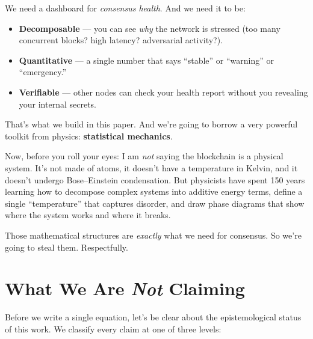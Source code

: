 \documentclass[11pt,a4paper]{article}
\begin{document}
We need a dashboard for \emph{consensus health}. And we need it to be:

\begin{itemize}
    \item \textbf{Decomposable} --- you can see \emph{why} the network is stressed (too many concurrent blocks? high latency? adversarial activity?).
    \item \textbf{Quantitative} --- a single number that says ``stable'' or ``warning'' or ``emergency.''
    \item \textbf{Verifiable} --- other nodes can check your health report without you revealing your internal secrets.
\end{itemize}

That's what we build in this paper. And we're going to borrow a very powerful toolkit from physics: \textbf{statistical mechanics}.

Now, before you roll your eyes: I am \emph{not} saying the blockchain is a physical system. It's not made of atoms, it doesn't have a temperature in Kelvin, and it doesn't undergo Bose--Einstein condensation. But physicists have spent 150 years learning how to decompose complex systems into additive energy terms, define a single ``temperature'' that captures disorder, and draw phase diagrams that show where the system works and where it breaks.

Those mathematical structures are \emph{exactly} what we need for consensus. So we're going to steal them. Respectfully.

\section{What We Are \emph{Not} Claiming}

Before we write a single equation, let's be clear about the epistemological status of this work. We classify every claim at one of three levels:
\end{document}
